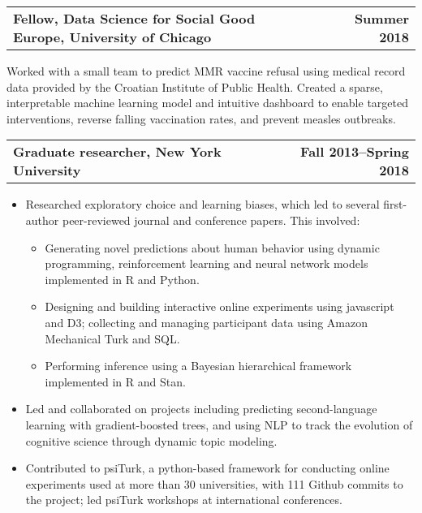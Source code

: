 \documentclass[10pt]{my_cv}
\begin{document}
\begin{addmargin}[1em]{0em}
\begin{tabular}{@{} L M R}
  \textbf{Fellow, Data Science for Social Good Europe, University of Chicago}& &\textbf{Summer 2018}\\
\end{tabular}\vspace{-1em}
Worked with a small team to predict MMR vaccine refusal using medical record data provided by the Croatian
Institute of Public Health. Created a sparse, interpretable machine learning
model and intuitive dashboard to enable targeted
interventions, reverse falling vaccination rates, and prevent measles outbreaks.

\begin{tabular}{@{} L M R}
  \textbf{Graduate researcher, New York University}& &\textbf{Fall 2013--Spring 2018}\\
\end{tabular}\vspace{-1em}
\begin{itemize}[noitemsep,topsep=-10pt,leftmargin=*]
\item Researched exploratory choice and learning biases, which led to several first-author peer-reviewed journal and conference papers. This involved:
  \begin{itemize}[noitemsep,topsep=0pt]
  \item Generating novel predictions about human behavior using dynamic programming,
    reinforcement learning and neural network models implemented in R and Python.
  \item Designing and building interactive online experiments using javascript and D3;
    collecting and managing participant data using Amazon Mechanical Turk and SQL.
  \item Performing inference using a Bayesian hierarchical framework implemented in R and Stan.
  \end{itemize}
\item Led and collaborated on projects including predicting second-language learning
  with gradient-boosted trees, and using NLP to track the evolution of cognitive
  science through dynamic topic modeling.
\item Contributed to psiTurk, a python-based framework for
  conducting online experiments used at more than 30 universities, with 111
  Github commits to the project; led psiTurk workshops at international conferences.\vspace{1em}
\end{itemize}
  


\end{addmargin}
\end{document}
